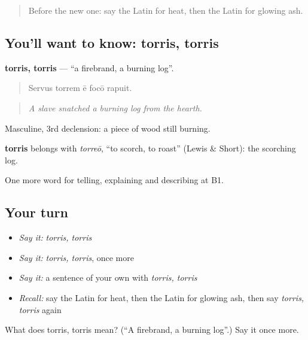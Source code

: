 \begin{quote}
Before the new one: say the Latin for heat, then the Latin for glowing ash.
\end{quote}

\subsection*{You'll want to know: torris, torris}
\textbf{torris, torris} — \textquotedblleft{}a firebrand, a burning log\textquotedblright{}.

\begin{quote}
Servus torrem ē focō rapuit.
\end{quote}

\begin{quote}
\emph{A slave snatched a burning log from the hearth.}
\end{quote}

Masculine, 3rd declension: a piece of wood still burning.

\begin{cousinweb}
\textbf{torris} belongs with \emph{torreō}, \textquotedblleft{}to scorch, to roast\textquotedblright{} (Lewis \& Short): the scorching log.
\end{cousinweb}

\begin{grammarlens}[title={What you've built}]
One more word for telling, explaining and describing at B1.
\end{grammarlens}

\subsection*{Your turn}
\begin{itemize}
\raggedright
  \item \emph{Say it:} \emph{torris, torris}
  \item \emph{Say it:} \emph{torris, torris}, once more
  \item \emph{Say it:} a sentence of your own with \emph{torris, torris}
  \item \emph{Recall:} say the Latin for heat, then the Latin for glowing ash, then say \emph{torris, torris} again
\end{itemize}

\begin{tcolorbox}[breakable,colback=teal!4,colframe=teal!35!black,title={Before you move on}]
What does torris, torris mean? (\textquotedblleft{}A firebrand, a burning log\textquotedblright{}.) Say it once more.
\end{tcolorbox}
